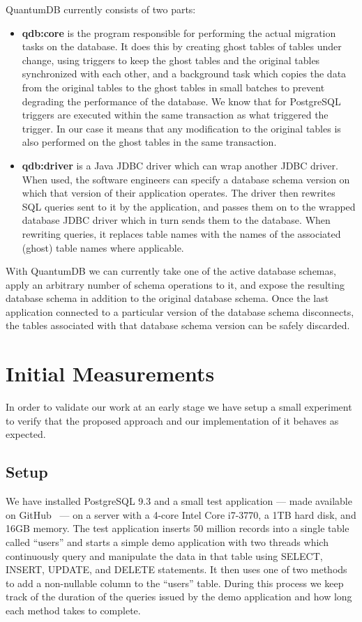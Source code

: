 \documentclass[conference]{IEEEtran}
\begin{document}
QuantumDB currently consists of two parts: 
\begin{itemize}
  \item{\textbf{qdb:core} is the program responsible for performing the actual migration tasks on the database. It does this by creating ghost tables of tables under change, using triggers to keep the ghost tables and the original tables synchronized with each other, and a background task which copies the data from the original tables to the ghost tables in small batches to prevent degrading the performance of the database. We know that for PostgreSQL triggers are executed within the same transaction as what triggered the trigger. In our case it means that any modification to the original tables is also performed on the ghost tables in the same transaction.}
  \item{\textbf{qdb:driver} is a Java JDBC driver which can wrap another JDBC driver. When used, the software engineers can specify a database schema version on which that version of their application operates. The driver then rewrites SQL queries sent to it by the application, and passes them on to the wrapped database JDBC driver which in turn sends them to the database. When rewriting queries, it replaces table names with the names of the associated (ghost) table names where applicable.}
\end{itemize}

With QuantumDB we can currently take one of the active database schemas, apply an arbitrary number of schema operations to it, and expose the resulting database schema in addition to the original database schema. Once the last application connected to a particular version of the database schema disconnects, the tables associated with that database schema version can be safely discarded.

\section{Initial Measurements} %

In order to validate our work at an early stage we have setup a small experiment to verify that the proposed approach and our implementation of it behaves as expected. 

\subsection{Setup}
We have installed PostgreSQL 9.3 and a small test application --- made available on GitHub~\cite{QuantumDB-RelEng-Demo} --- on a server with a 4-core Intel Core i7-3770, a 1TB hard disk, and 16GB memory. The test application inserts 50 million records into a single table called ``users'' and starts a simple demo application with two threads which continuously query and manipulate the data in that table using SELECT, INSERT, UPDATE, and DELETE statements. It then uses one of two methods to add a non-nullable column to the ``users'' table. During this process we keep track of the duration of the queries issued by the demo application and how long each method takes to complete. 
\end{document}
